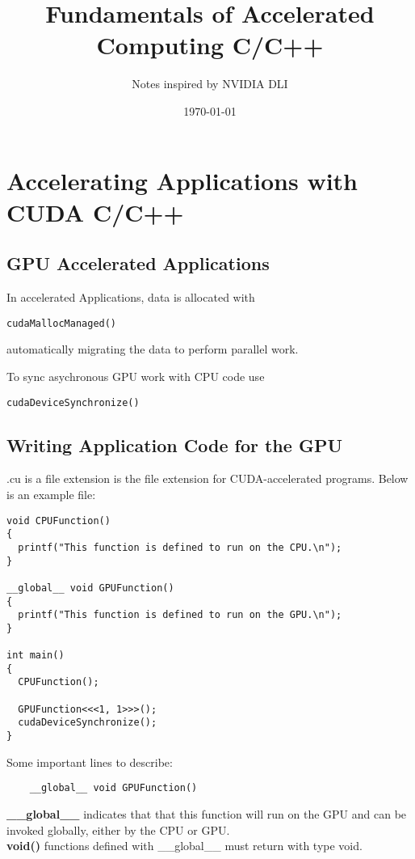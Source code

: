 \documentclass{article}
\title{Fundamentals of Accelerated Computing C/C++}
\author{Notes inspired by NVIDIA DLI}
\date{\today}
\begin{document}
\maketitle

\section{Accelerating Applications with CUDA C/C++}
\subsection{GPU Accelerated Applications}
In accelerated Applications, data is allocated with 
\begin{verbatim}
cudaMallocManaged()
\end{verbatim}
automatically migrating the data to perform parallel work.

To sync asychronous GPU work with CPU code use
\begin{verbatim}
cudaDeviceSynchronize()
\end{verbatim}

\subsection{Writing Application Code for the GPU}

.cu is a file extension is the file extension for CUDA-accelerated programs.
Below is an example file:
\begin{verbatim}
void CPUFunction()
{
  printf("This function is defined to run on the CPU.\n");
}

__global__ void GPUFunction() 
{
  printf("This function is defined to run on the GPU.\n");
}

int main()
{
  CPUFunction();

  GPUFunction<<<1, 1>>>();
  cudaDeviceSynchronize();
}
\end{verbatim}

\newpage

Some important lines to describe:


\begin{verbatim}
    __global__ void GPUFunction()
\end{verbatim}

\noindent \textbf{\_\_global\_\_} indicates that that this function will run on the GPU and can be invoked globally, either by the CPU or GPU.\\

\noindent \textbf{void()} functions defined with \_\_global\_\_ must return with type void.
\end{document}
